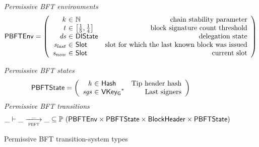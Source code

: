 \documentclass[11pt,a4paper]{article}
\newcommand{\powerset}[1]{\mathbb{P}~#1}
\newcommand{\var}[1]{\mathit{#1}}
\newcommand{\type}[1]{\mathsf{#1}}
\newcommand{\trans}[2]{\xlongrightarrow[\textsc{#1}]{#2}}
\newcommand{\seqof}[1]{#1^{*}}
\newcommand{\Hash}{\type{Hash}}  %
\newcommand{\Slot}{\type{Slot}}
\newcommand{\VKeyGen}{\type{VKey_G}}
\newcommand{\DelegState}{\type{DIState}}
\begin{document}
\begin{figure}[ht]
  \emph{Permissive BFT environments}
  \begin{equation*}
    \PBFTEnv =
    \left(
      \begin{array}{r@{~\in~}lr}
        k & \mathbb{N} & \text{chain stability parameter} \\
        t & \left[\frac{1}{5}, \frac{1}{4}\right] & \text{block signature count threshold}\\
        \var{ds} & \DelegState & \text{delegation state} \\
        \var{s_{last}} & \Slot & \text{slot for which the last known block was issued} \\
        \var{s_{now}} & \Slot & \text{current slot} \\
      \end{array}
    \right)
  \end{equation*}

  \emph{Permissive BFT states}
  \begin{equation*}
    \PBFTState =
    \left(
      \begin{array}{r@{~\in~}lr}
        \var{h} & \Hash & \text{Tip header hash} \\
        \var{sgs} & \seqof{\VKeyGen} & \text{Last signers}
      \end{array}
    \right)
  \end{equation*}
  \emph{Permissive BFT transitions}
  \begin{equation*}
    \_ \vdash \var{\_} \trans{pbft}{\_} \var{\_} \subseteq
    \powerset (\PBFTEnv \times \PBFTState \times \Bhead \times \PBFTState)
  \end{equation*}
  \caption{Permissive BFT transition-system types}
  \label{fig:ts-types:pbft}
\end{figure}
\end{document}
